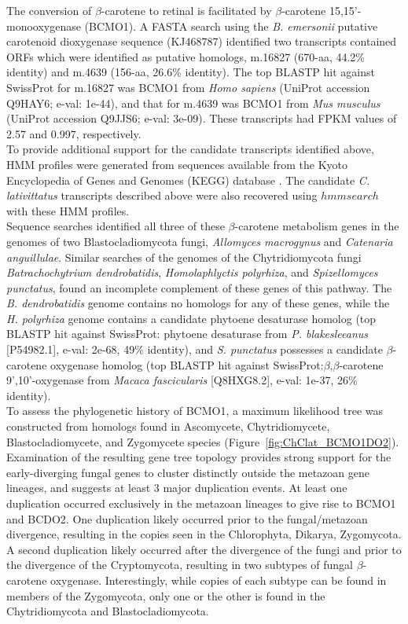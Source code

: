 \indent The conversion of $\beta$-carotene to retinal is facilitated by $\beta$-carotene 15,15'-monooxygenase (BCMO1). A FASTA search using the \textit{B. emersonii} putative carotenoid dioxygenase sequence (KJ468787) identified two transcripts contained ORFs which were identified as putative homologs, m.16827 (670-aa, 44.2\% identity) and m.4639 (156-aa, 26.6\% identity). The top BLASTP hit against SwissProt for m.16827 was BCMO1 from \textit{Homo sapiens} (UniProt accession Q9HAY6; e-val: 1e-44), and that for m.4639 was BCMO1 from \textit{Mus musculus} (UniProt accession Q9JJS6; e-val: 3e-09). These transcripts had FPKM values of 2.57 and 0.997, respectively. \\
\indent To provide additional support for the candidate transcripts identified above, HMM profiles were generated from sequences available from the Kyoto Encyclopedia of Genes and Genomes (KEGG) database \cite{Kanehisa2000,Kanehisa2014}. The candidate \textit{C. lativittatus} transcripts described above were also recovered using $hmmsearch$ with these HMM profiles. \\
\indent Sequence searches identified all three of these $\beta$-carotene metabolism genes in the genomes of two Blastocladiomycota fungi, \textit{Allomyces macrogynus} and \textit{Catenaria anguillulae}. Similar searches of the genomes of the Chytridiomycota fungi \textit{Batrachochytrium dendrobatidis}, \textit{Homolaphlyctis polyrhiza}, and \textit{Spizellomyces punctatus}, found an incomplete complement of these genes of this pathway. The \textit{B. dendrobatidis} genome contains no homologs for any of these genes, while the \textit{H. polyrhiza} genome contains a candidate phytoene desaturase homolog (top BLASTP hit against SwissProt: phytoene desaturase from \textit{P. blakesleeanus} [P54982.1], e-val: 2e-68, 49\% identity), and \textit{S. punctatus} possesses a candidate $\beta$-carotene oxygenase homolog (top BLASTP hit against SwissProt:$\beta$,$\beta$-carotene 9',10'-oxygenase from \textit{Macaca fascicularis} [Q8HXG8.2], e-val: 1e-37, 26\% identity).\\
\indent To assess the phylogenetic history of BCMO1, a maximum likelihood tree was constructed from homologs found in Ascomycete, Chytridiomycete, Blastocladiomycete, and Zygomycete species (Figure~\ref{fig:ChClat_BCMO1DO2}). Examination of the resulting gene tree topology provides strong support for the early-diverging fungal genes to cluster distinctly outside the metazoan gene lineages, and suggests at least 3 major duplication events. At least one duplication occurred exclusively in the metazoan lineages to give rise to BCMO1 and BCDO2. One duplication likely occurred prior to the fungal/metazoan divergence, resulting in the copies seen in the Chlorophyta, Dikarya, Zygomycota. A second duplication likely occurred after the divergence of the fungi and prior to the divergence of the Cryptomycota, resulting in two subtypes of fungal $\beta$-carotene oxygenase. Interestingly, while copies of each subtype can be found in members of the Zygomycota, only one or the other is found in the Chytridiomycota and Blastocladiomycota.\\
